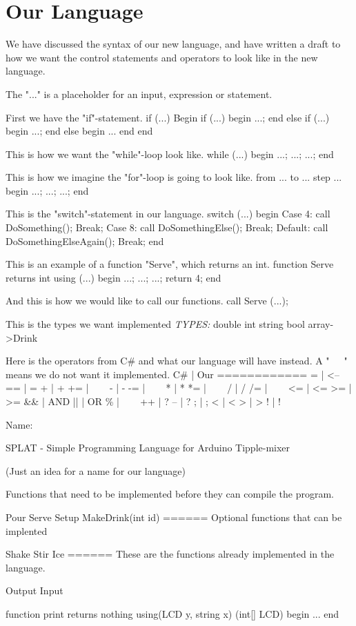 \chapter{Our Language}
We have discussed the syntax of our new language, and have written a draft to how we want the control statements and operators to look like in the new language.

The "..." is a placeholder for an input, expression or statement.

First we have the "if"-statement.
if (...)
Begin
	if (...)
	begin
		...;
	end
	else if (...)
	begin
		...;
	end
	else
	begin
	...
	end
end

This is how we want the "while"-loop look like.
while (...)
begin
	...;
	...;
	...;
end
	
This is how we imagine the "for"-loop is going to look like.
from ... to ... step ...
begin
	...;
	...;
	...;
end

This is the "switch"-statement in our language.
switch (...)
begin
	Case 4:
		call DoSomething();
		Break;
	Case 8:
		call DoSomethingElse();
		Break;
	Default:
		call DoSomethingElseAgain();
	Break;
end

This is an example of a function "Serve", which returns an int.
function Serve returns int using (...)
begin
	...;
	...;
	...;
	return 4;
end

And this is how we would like to call our functions.
call Serve (...);

This is the types we want implemented
\textit{TYPES:}
double
int
string
bool
array->Drink

Here is the operators from C\# and what our language will have instead. A "~~~" means we do not want it implemented.
C\#	|	Our
============
=  	|	<--
==	|	=
+	|	+
+=	|	~~~
-	|	-
-=	|	~~~
*	|	*
*=	|	~~~
/	|	/
/=	|	~~~
<=	|	<=
>=	|	>=
&&	|	AND
||	|	OR
\%	|	~~~
++	|	?
--	|	?
;	|	;
<	|	<
>	|	>
!	|	!


Name:

SPLAT - Simple Programming Language for Arduino Tipple-mixer


(Just an idea for a name for our language)







Functions that need to be implemented before they can compile the program.

Pour
Serve
Setup
MakeDrink(int id)
======
Optional functions that can be implented

Shake
Stir
Ice
======
These are the functions already implemented in the language.

Output
Input

function print returns nothing using(LCD y, string x)     (int[] LCD)
begin
	...
end